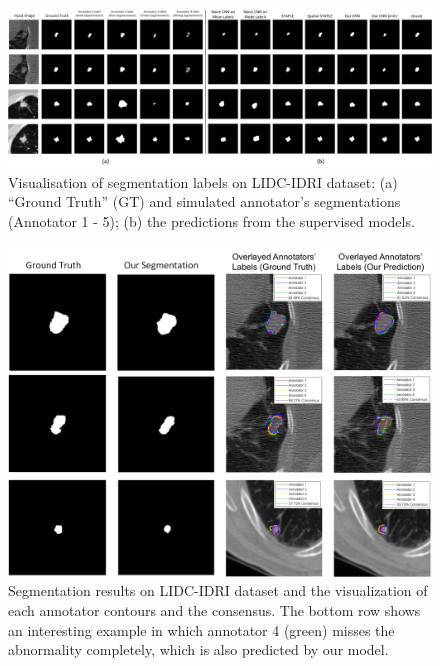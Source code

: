 \begin{figure}[t!]
    \vspace{-3mm}
    \centering
    \includegraphics[width=\linewidth]{chapter_8_neurips/picture17.jpg}
        \vspace{-2mm}
    \caption{\footnotesize Visualisation of segmentation labels on LIDC-IDRI dataset: (a) ``Ground Truth'' (GT) and simulated annotator's segmentations (Annotator 1 - 5); (b) the predictions from the supervised models. } 
    \label{LIDC segmentation}
    \vspace{-5mm}
\end{figure}


\begin{figure}[t!]
        \centering
        \includegraphics[width=\linewidth]{chapter_8_neurips/picture10.jpg}
        \caption{\footnotesize Segmentation results on LIDC-IDRI dataset and the visualization of each annotator contours and the consensus. The bottom row shows an interesting example in which annotator 4 (green) misses the abnormality completely, which is also predicted by our model.}
        \label{LIDCresults}
\end{figure}


